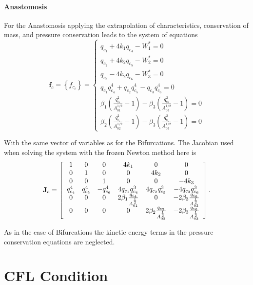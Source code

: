 \documentclass[a4paper, oneside]{discothesis}
\begin{document}
\paragraph{Anastomosis} \label{par:anastomosis}
For the Anastomosis applying the extrapolation of characteristics, conservation of mass, and pressure conservation leads to the system of equations
$$
\mathbf{f}_c=\left\{f_{c_i}\right\}=\left\{\begin{array}{l}
		q_{c_1}+4 k_1 q_{c_4}-W_1^*=0 \\
		q_{c_2}+4 k_2 q_{c_5}-W_2^*=0 \\
		q_{c_3}-4 k_2 q_{c_6}-W_3^*=0 \\
		q_{c_1} q_{c_4}^4+q_{c_2} q_{c_5}^4-q_{c_3} q_{c_6}^4=0 \\
		\beta_1\left(\frac{q_{c_4}^2}{A_{01}^{1 / 2}}-1\right)-\beta_3\left(\frac{q_{c_6}^2}{A_{03}^{1 / 2}}-1\right)=0 \\
		\beta_2\left(\frac{q_{c_5}^2}{A_{02}^{1 / 2}}-1\right)-\beta_3\left(\frac{q_{c_6}^2}{A_{03}^{1 / 2}}-1\right)=0
\end{array}\right.
$$

With the same vector of variables as for the Bifurcations.
The Jacobian used when solving the system with the frozen Newton method here is
$$\mathbf{J}_{c}=\left[\begin{array}{c c c c c c}
		1&0&0&4k_1&0&0\\
		0&1&0&0&4k_2&0\\
		0&0&1&0&0&-4k_3\\
		q_{c_4}^4 & q_{c_5}^4 & -q_{c_6}^4 & 4q_{c_1}q_{c_4}^3 & 4q_{c_2}q_{c_5}^3 & -4q_{c_3}q_{c_6}^3 \\
		0 & 0 & 0 & 2\beta_1\frac{q_{c_4}}{A_{01}^{\frac{1}{2}}} & 0 & -2\beta_3\frac{q_{c_6}}{A_{03}^{\frac{1}{2}}} \\
		0 & 0 & 0 & 0 & 2\beta_2\frac{q_{c_5}}{A_{02}^{\frac{1}{2}}} &  -2\beta_3\frac{q_{c_6}}{A_{03}^{\frac{1}{2}}} \\
	\end{array} 
\right].
$$

As in the case of Bifurcations the kinetic energy terms in the pressure conservation equations are neglected.

\section{CFL Condition} \label{sec:cfl}
\end{document}
